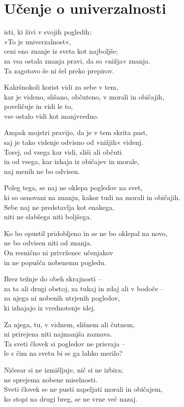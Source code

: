 \cleartorecto
{}
\chapter{Učenje o univerzalnosti}

isti, ki živi v svojih pogledih:\\
»To je univerzalnost«,\\
ceni eno znanje iz sveta kot najboljše;\\
za vsa ostala znanja pravi, da so »nižja« znanja.\\
Ta zagotovo še ni šel preko prepirov.

Kakršnokoli korist vidi za sebe v tem,\\
kar je videno, slišano, občuteno, v morali in običajih,\\
poveličuje in vidi le to,\\
vse ostalo vidi kot manjvredno.

Ampak mojstri pravijo, da je v tem skrita past,\\
saj je tako videnje odvisno od »nižjih« videnj.\\
Torej, od vsega kar vidi, sliši ali občuti\\
in od vsega, kar izhaja iz običajev in morale,\\\vin naj menih ne bo odvisen.

\clearpage

Poleg tega, se naj ne oklepa pogledov na svet,\\
ki so osnovani na znanju, kakor tudi na morali in običajih.\\
Sebe naj ne predstavlja kot enakega,\\
niti ne slabšega niti boljšega.

Ko bo opustil pridobljeno in se ne bo oklepal na novo,\\
ne bo odvisen niti od znanja.\\
On resnično ni privrženec učenjakov\\
in ne popušča nobenemu pogledu.

Brez težnje do obeh skrajnosti --\\
za ta ali drugi obstoj, za tukaj in zdaj ali v bodoče --\\
za njega ni nobenih utrjenih pogledov,\\
ki izhajajo iz vrednotenje idej.

Za njega, tu, v vidnem, slišnem ali čutnem,\\
ni prirejena niti najmanjša zaznava.\\
Ta sveti človek si pogledov ne prisvaja --\\
le s čim na svetu bi se ga lahko merilo?

Ničesar si ne izmišljuje, nič si ne izbira;\\
ne sprejema nobene miselnosti.\\
Sveti človek se ne pusti zapeljati morali in običajem,\\
ko stopi na drugi breg, se ne vrne več nazaj.


